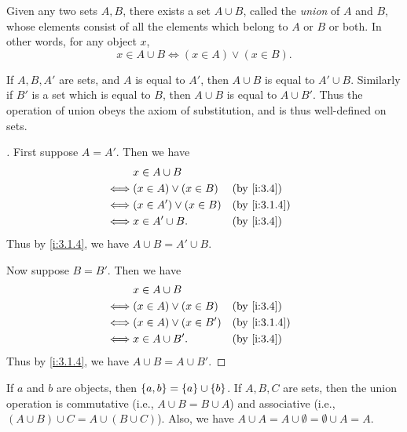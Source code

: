 \begin{ax}\label{i:3.4}
  Given any two sets \(A, B\), there exists a set \(A \cup B\), called the \emph{union} of \(A\) and \(B\), whose elements consist of all the elements which belong to \(A\) or \(B\) or both.
  In other words, for any object \(x\),
  \[
    x \in A \cup B \iff (x \in A) \lor (x \in B).
  \]
\end{ax}

\setcounter{thm}{11}
\begin{rmk}\label{i:3.1.12}
  If \(A, B, A'\) are sets, and \(A\) is equal to \(A'\), then \(A \cup B\) is equal to \(A' \cup B\).
  Similarly if \(B'\) is a set which is equal to \(B\), then \(A \cup B\) is equal to \(A \cup B'\).
  Thus the operation of union obeys the axiom of substitution, and is thus well-defined on sets.
\end{rmk}

\begin{proof}[]
  First suppose \(A = A'\).
  Then we have
  \begin{align*}
         & x \in A \cup B                              \\
    \iff & (x \in A) \lor (x \in B)  &  & \by{i:3.4}   \\
    \iff & (x \in A') \lor (x \in B) &  & \by{i:3.1.4} \\
    \iff & x \in A' \cup B.          &  & \by{i:3.4}
  \end{align*}
  Thus by \cref{i:3.1.4}, we have \(A \cup B = A' \cup B\).

  Now suppose \(B = B'\).
  Then we have
  \begin{align*}
         & x \in A \cup B                              \\
    \iff & (x \in A) \lor (x \in B)  &  & \by{i:3.4}   \\
    \iff & (x \in A) \lor (x \in B') &  & \by{i:3.1.4} \\
    \iff & x \in A \cup B'.          &  & \by{i:3.4}
  \end{align*}
  Thus by \cref{i:3.1.4}, we have \(A \cup B = A \cup B'\).
\end{proof}

\begin{lem}\label{i:3.1.13}
  If \(a\) and \(b\) are objects, then \(\left\lbrace a, b\right\rbrace = \left\lbrace a\right\rbrace \cup \left\lbrace b\right\rbrace\).
  If \(A, B, C\) are sets, then the union operation is commutative (i.e., \(A \cup B = B \cup A\)) and associative (i.e., \((A \cup B) \cup C = A \cup (B \cup C)\)).
  Also, we have \(A \cup A = A \cup \emptyset = \emptyset \cup A = A\).
\end{lem}

